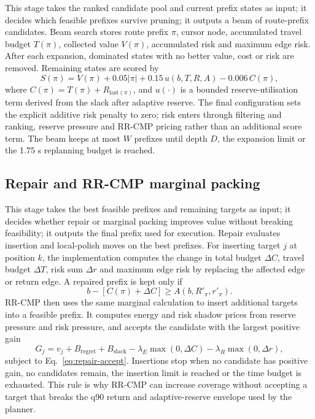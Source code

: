 \documentclass[preprint,12pt]{elsarticle}
\begin{document}
This stage takes the ranked candidate pool and current prefix states as input; it decides which feasible prefixes survive pruning; it outputs a beam of route-prefix candidates. Beam search stores route prefix $\pi$, cursor node, accumulated travel budget $T(\pi)$, collected value $V(\pi)$, accumulated risk and maximum edge risk. After each expansion, dominated states with no better value, cost or risk are removed. Remaining states are scored by
\begin{equation}
    S(\pi)=V(\pi)+0.05|\pi|+0.15\,u(b,T,R,A)-0.006\,C(\pi),
    \label{eq:plan-score}
\end{equation}
where $C(\pi)=T(\pi)+R_{\mathrm{last}(\pi)}$, and $u(\cdot)$ is a bounded reserve-utilisation term derived from the slack after adaptive reserve. The final configuration sets the explicit additive risk penalty to zero; risk enters through filtering and ranking, reserve pressure and RR-CMP pricing rather than an additional score term. The beam keeps at most $W$ prefixes until depth $D$, the expansion limit or the 1.75 s replanning budget is reached.

\subsection{Repair and RR-CMP marginal packing}

This stage takes the best feasible prefixes and remaining targets as input; it decides whether repair or marginal packing improves value without breaking feasibility; it outputs the final prefix used for execution. Repair evaluates insertion and local-polish moves on the best prefixes. For inserting target $j$ at position $k$, the implementation computes the change in total budget $\Delta C$, travel budget $\Delta T$, risk sum $\Delta r$ and maximum edge risk by replacing the affected edge or return edge. A repaired prefix is kept only if
\begin{equation}
    b-\left[C(\pi)+\Delta C\right]\ge A\left(b,R'_{\pi},r'_{\pi}\right).
    \label{eq:repair-accept}
\end{equation}
RR-CMP then uses the same marginal calculation to insert additional targets into a feasible prefix. It computes energy and risk shadow prices from reserve pressure and risk pressure, and accepts the candidate with the largest positive gain
\begin{equation}
    G_j=v_j+B_{\mathrm{regret}}+B_{\mathrm{slack}}
    -\lambda_E\max(0,\Delta C)-\lambda_R\max(0,\Delta r),
    \label{eq:packing-gain}
\end{equation}
subject to Eq.~\eqref{eq:repair-accept}. Insertions stop when no candidate has positive gain, no candidates remain, the insertion limit is reached or the time budget is exhausted. This rule is why RR-CMP can increase coverage without accepting a target that breaks the q90 return and adaptive-reserve envelope used by the planner.
\end{document}
